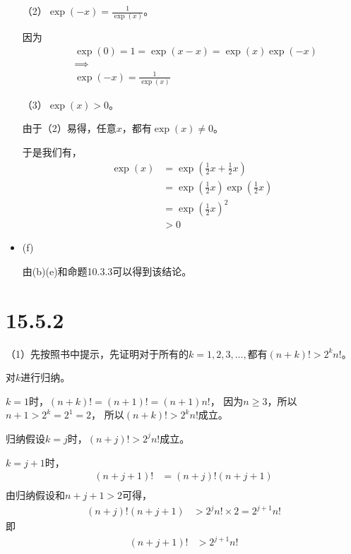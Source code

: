 \documentclass{article}
\begin{document}
\begin{itemize}
        （2）$\exp(-x) = \frac{1}{\exp(x)}$。

        因为
        \begin{align*}
           & \exp(0) = 1 = \exp(x - x) = \exp(x)\exp(-x) \\
           & \implies                                    \\
           & \exp(-x) = \frac{1}{\exp(x)}
        \end{align*}

        （3）$\exp(x) > 0$。

        由于（2）易得，任意$x$，都有$\exp(x) \neq 0$。

        于是我们有，
        \begin{align*}
          \exp(x) & = \exp(\frac{1}{2}x + \frac{1}{2}x )   \\
                  & = \exp(\frac{1}{2}x)\exp(\frac{1}{2}x) \\
                  & = \exp(\frac{1}{2}x)^2                 \\
                  & > 0
        \end{align*}

  \item (f)

        由(b)(e)和命题10.3.3可以得到该结论。

\end{itemize}

\section*{15.5.2}

（1）先按照书中提示，先证明对于所有的$k=1,2,3,...,$都有$(n + k)! > 2^kn!$。

对$k$进行归纳。

$k = 1$时，$(n + k)! = (n + 1)! = (n + 1)n!$，
因为$n \geq 3$，所以$n + 1 > 2^k = 2^1 = 2$，
所以$(n + k)! > 2^kn!$成立。

归纳假设$k = j$时，$(n + j)! > 2^jn!$成立。

$k = j + 1$时，
\begin{align*}
  (n + j + 1)! & = (n + j)!(n + j + 1) \\
\end{align*}
由归纳假设和$n + j + 1 > 2$可得，
\begin{align*}
  (n + j)!(n + j + 1) & > 2^jn! \times 2 = 2^{j + 1}n!
\end{align*}
即
\begin{align*}
  (n + j + 1)! & > 2^{j + 1}n!
\end{align*}
\end{document}
